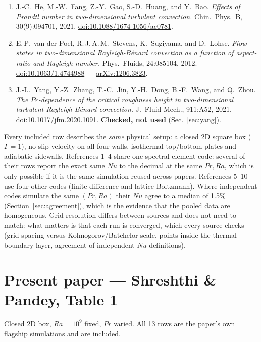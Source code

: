 \documentclass[11pt]{article}
\begin{document}
\begin{enumerate}[leftmargin=1.6em, itemsep=0.6em]
{thermal convection.} Phys.\ Fluids, 31:125101, 2019.
\href{https://doi.org/10.1063/1.5129818}{doi:10.1063/1.5129818} ---
\href{https://arxiv.org/abs/1911.04042}{arXiv:1911.04042}.
\item J.-C.\ He, M.-W.\ Fang, Z.-Y.\ Gao, S.-D.\ Huang, and Y.\ Bao.
\emph{Effects of Prandtl number in two-dimensional turbulent convection.}
Chin.\ Phys.\ B, 30(9):094701, 2021.
\href{https://doi.org/10.1088/1674-1056/ac0781}{doi:10.1088/1674-1056/ac0781}.
\item E.\,P.\ van der Poel, R.\,J.\,A.\,M.\ Stevens, K.\ Sugiyama, and
D.\ Lohse. \emph{Flow states in two-dimensional Rayleigh-B\'enard
convection as a function of aspect-ratio and Rayleigh number.} Phys.\
Fluids, 24:085104, 2012.
\href{https://doi.org/10.1063/1.4744988}{doi:10.1063/1.4744988} ---
\href{https://arxiv.org/abs/1206.3823}{arXiv:1206.3823}.
\item J.-L.\ Yang, Y.-Z.\ Zhang, T.-C.\ Jin, Y.-H.\ Dong, B.-F.\ Wang,
and Q.\ Zhou. \emph{The $Pr$-dependence of the critical roughness height
in two-dimensional turbulent Rayleigh-B\'enard convection.} J.\ Fluid
Mech., 911:A52, 2021.
\href{https://doi.org/10.1017/jfm.2020.1091}{doi:10.1017/jfm.2020.1091}.
\textbf{Checked, not used} (Sec.~\ref{sec:yang}).
\end{enumerate}

\noindent Every included row describes the \emph{same} physical setup:
a closed 2D square box ($\Gamma=1$), no-slip velocity on all four walls,
isothermal top/bottom plates and adiabatic sidewalls. References 1--4 share
one spectral-element code: several of their rows report the exact same $Nu$
to the decimal at the same $Pr, Ra$, which is only possible if it is the
same simulation reused across papers. References 5--10 use four other codes
(finite-difference and lattice-Boltzmann). Where independent codes simulate
the same $(Pr, Ra)$ their $Nu$ agree to a median of 1.5\%
(Section~\ref{sec:agreement}), which is the evidence that the pooled data
are homogeneous. Grid resolution differs between sources and does not need
to match: what matters is that each run is converged, which every source
checks (grid spacing versus Kolmogorov/Batchelor scale, points inside the
thermal boundary layer, agreement of independent $Nu$ definitions).

\section{Present paper --- Shreshthi \& Pandey, Table 1}
Closed 2D box, $Ra=10^9$ fixed, $Pr$ varied. All 13 rows are the paper's own
flagship simulations and are included.
\end{document}
